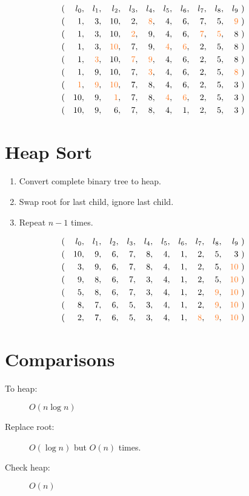 \documentclass{notes}
\begin{document}
  \begin{align*}
  &(&l_0&,&l_1&,&l_2&,&l_3&,&l_4&,&l_5&,&l_6&,&l_7&,&l_8&,&l_9\ &)&\\
  &(&1&,&3&,&10&,&2&,&{\color{atuorange}8}&,&4&,&6&,&7&,&5&,&{\color{atuorange}9}\ &)&\\
  &(&1&,&3&,&10&,&{\color{atuorange}2}&,&9&,&4&,&6&,&{\color{atuorange}7}&,&{\color{atuorange}5}&,&8\ &)&\\
  &(&1&,&3&,&{\color{atuorange}10}&,&7&,&9&,&{\color{atuorange}4}&,&{\color{atuorange}6}&,&2&,&5&,&8\ &)&\\
  &(&1&,&{\color{atuorange}3}&,&10&,&{\color{atuorange}7}&,&{\color{atuorange}9}&,&4&,&6&,&2&,&5&,&8\ &)&\\
  &(&1&,&9&,&10&,&7&,&{\color{atuorange}3}&,&4&,&6&,&2&,&5&,&{\color{atuorange}8}\ &)&\\
  &(&{\color{atuorange}1}&,&{\color{atuorange}9}&,&{\color{atuorange}10}&,&7&,&8&,&4&,&6&,&2&,&5&,&3\ &)&\\
  &(&10&,&9&,&{\color{atuorange}1}&,&7&,&8&,&{\color{atuorange}4}&,&{\color{atuorange}6}&,&2&,&5&,&3\ &)&\\
  &(&10&,&9&,&6&,&7&,&8&,&4&,&1&,&2&,&5&,&3\ &)&\\
  \end{align*}
  
  \section*{Heap Sort}
    \begin{enumerate}
      \item Convert complete binary tree to heap.
      \item Swap root for last child, ignore last child.
      \item Repeat \(n-1\) times.
    \end{enumerate}

    \begin{align*}
      &(&l_0&,&l_1&,&l_2&,&l_3&,&l_4&,&l_5&,&l_6&,&l_7&,&l_8&,&l_9\ &)&\\
      &(&10&,&9&,&6&,&7&,&8&,&4&,&1&,&2&,&5&,&3\ &)&\\
      &(&3&,&9&,&6&,&7&,&8&,&4&,&1&,&2&,&5&,&{\color{atuorange}10}\ &)&\\
      &(&9&,&8&,&6&,&7&,&3&,&4&,&1&,&2&,&5&,&{\color{atuorange}10}\ &)&\\
      &(&5&,&8&,&6&,&7&,&3&,&4&,&1&,&2&,&{\color{atuorange}9}&,&{\color{atuorange}10}\ &)&\\
      &(&8&,&7&,&6&,&5&,&3&,&4&,&1&,&2&,&{\color{atuorange}9}&,&{\color{atuorange}10}\ &)&\\
      &(&2&,&7&,&6&,&5&,&3&,&4&,&1&,&{\color{atuorange}8}&,&{\color{atuorange}9}&,&{\color{atuorange}10}\ &)&\\
    \end{align*}

  \section*{Comparisons}

    \begin{description}
      \item[To heap:] \(O(n \log n)\)
      \item[Replace root:] \(O(\log n)\) but \( O(n) \) times.
      \item[Check heap:] \(O(n)\) 
    \end{description}

  
\end{document}
